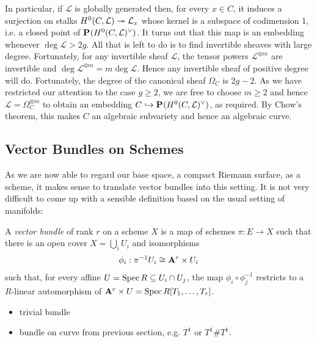 \documentclass[12pt]{ociamthesis}  %
\begin{document}
In particular, if $\mathcal L$ is globally generated then,
for every $x\in C$, it induces a surjection on stalks
$H^0(C,\mathcal L) \twoheadrightarrow \mathcal L_x$ whose kernel is a
subspace of codimension 1, i.e. a closed point of
$\mathbf{P}^{}_{}(H^0(C,\mathcal L)^\vee)$. It turns out that this map is an embedding
whenever $\deg\mathcal L > 2g$. \cite[Proposition 2.14]{harris2011}
All that is left to do is to find invertible sheaves with large
degree. Fortunately, for any invertible sheaf $\mathcal L$,
the tensor powers $\mathcal L^{\otimes m}$ are invertible and
$\deg\mathcal L^{\otimes m} = m\deg\mathcal L$. Hence any invertible
sheaf of positive degree will do. Fortunately, the degree of
the canonical sheaf $\Omega_C$ is $2g-2$. As we have restricted
our attention to the case $g\geq 2$, we are free to choose
$m\geq 2$ and hence $\mathcal L = \Omega_C^{\otimes m}$ to obtain
an embedding $C\hookrightarrow\mathbf{P}^{}_{}(H^0(C,\mathcal L)^\vee)$, as
required.
By Chow's theorem, this makes $C$ an algebraic subvariety
and hence an algebraic curve.

\subsection{Vector Bundles on Schemes}

As we are now able to regard our base space, a compact Riemann
surface, as a scheme, it makes sense to translate vector bundles
into this setting. It is not very difficult to come up with a
sensible definition based on the usual setting of manifolds:

\begin{definition}
  \label{def:vector_bundle}
  A \emph{vector bundle} of rank $r$ on a scheme $X$ is
  a map of schemes $\pi : E \to X$ such that there is an open
  cover $X = \bigcup_i U_i$ and isomorphisms
  \begin{align}\label{eq:trivialisation}
    \phi_i : {\pi}^{-1}U_i \cong \mathbf{A}^{r}_{}\times U_i
  \end{align}
  such that, for every affine $U = \operatorname{Spec} R \subseteq U_i \cap U_j$,
  the map $\phi_i \circ \phi^{-1}_j$ restricts to a $R$-linear
  automorphism of $\mathbf{A}^{r}_{}\times U = \operatorname{Spec} R[T_1,\ldots,T_r]$.
\end{definition}

\begin{example}
  \begin{itemize}
    \item trivial bundle
    \item bundle on curve from previous section, e.g. $T^1$ or
      $T^1 \# T^1$.
  \end{itemize}
\end{example}
\end{document}
